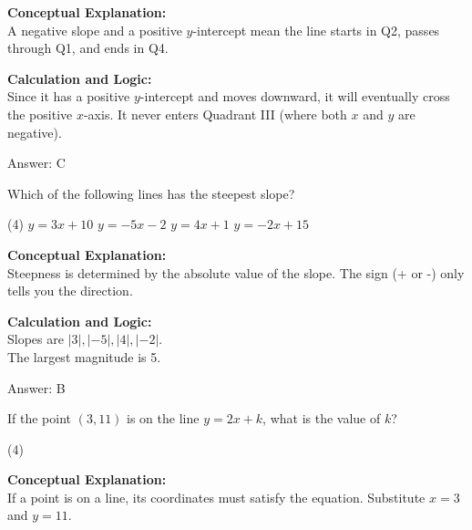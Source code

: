 \documentclass[11pt,paper=a4,answers]{exam}
\begin{document}
\begin{questions}
\begin{solution}
\textbf{Conceptual Explanation:} \\
A negative slope and a positive $y$-intercept mean the line starts in Q2, passes through Q1, and ends in Q4.

\vspace{10pt}
\textbf{Calculation and Logic:} \\
Since it has a positive $y$-intercept and moves downward, it will eventually cross the positive $x$-axis. It never enters Quadrant III (where both $x$ and $y$ are negative).

\vspace{15pt}
Answer: \colorbox{yellow!100}{C}
\end{solution}

\vspace{20pt}

\question
Which of the following lines has the steepest slope?
\begin{tasks}(4)
    \task $y = 3x + 10$
    \task $y = -5x - 2$
    \task $y = 4x + 1$
    \task $y = -2x + 15$
\end{tasks}

\begin{solution}
\textbf{Conceptual Explanation:} \\
Steepness is determined by the absolute value of the slope. The sign (+ or -) only tells you the direction.

\vspace{10pt}
\textbf{Calculation and Logic:} \\
Slopes are $|3|, |-5|, |4|, |-2|$. \\
The largest magnitude is 5.

\vspace{15pt}
Answer: \colorbox{yellow!100}{B}
\end{solution}

\vspace{20pt}

\question
If the point $(3, 11)$ is on the line $y = 2x + k$, what is the value of $k$?
\begin{tasks}(4)
\end{tasks}

\begin{solution}
\textbf{Conceptual Explanation:} \\
If a point is on a line, its coordinates must satisfy the equation. Substitute $x=3$ and $y=11$.


\end{solution}
\end{questions}
\end{document}
